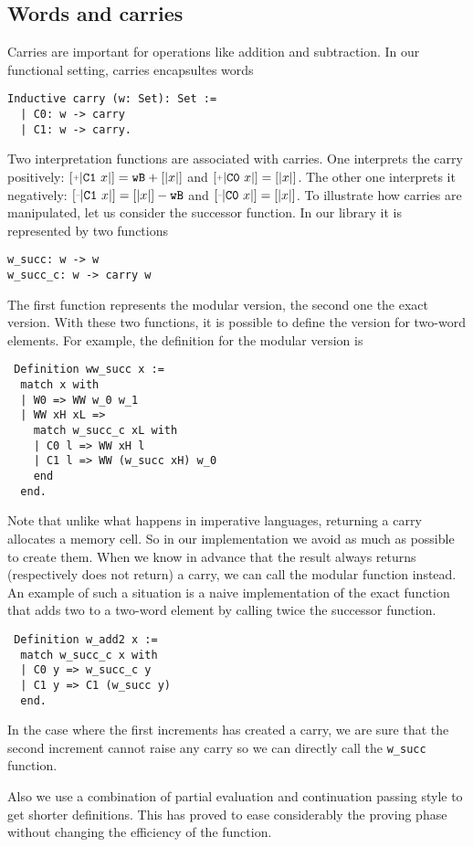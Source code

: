 \subsection{Words and carries}

Carries are important for operations like addition and subtraction.
In our functional setting, carries encapsultes words
\begin{verbatim}
Inductive carry (w: Set): Set :=
  | C0: w -> carry
  | C1: w -> carry.
\end{verbatim}
Two interpretation functions are associated with carries.
One interprets the carry positively: $\ICP{\CI x} = \wB + [|x|]$ and
$\ICP{\CO x} = [|x|]$. 
The other one interprets it negatively:
$\ICM{\CI x} = [|x|] - \wB$ and $\ICM{\CO x} = [|x|]$.
To illustrate how carries are manipulated, let us consider the successor function.
In our library it is represented by two functions
\begin{verbatim}
w_succ: w -> w
w_succ_c: w -> carry w
\end{verbatim}
The first function represents the modular version, the second one the exact 
version. With these two functions, it is possible to define the version
for two-word elements. For example, the definition for the modular version is
\begin{verbatim}
 Definition ww_succ x :=
  match x with
  | W0 => WW w_0 w_1
  | WW xH xL =>
    match w_succ_c xL with
    | C0 l => WW xH l
    | C1 l => WW (w_succ xH) w_0
    end
  end.
\end{verbatim}
Note that unlike what happens in imperative languages, returning
a carry allocates a memory cell. So in our implementation
we avoid as much as possible to create them. When we know in advance 
that the result always returns (respectively does not return) a carry, we can call the modular function instead. 
An example of such a situation is a naive implementation of the exact function that adds two to a 
two-word element by calling twice the successor function.
\begin{verbatim}
 Definition w_add2 x :=
  match w_succ_c x with
  | C0 y => w_succ_c y
  | C1 y => C1 (w_succ y)
  end.
\end{verbatim}
In the case where the first increments has created a carry, we are sure that the second
increment cannot raise any carry so we can directly call the {\tt w\_succ} function.

Also we use a combination of partial evaluation and continuation passing style to get
shorter definitions. This has proved to ease considerably the proving phase without
changing the efficiency of the function.

